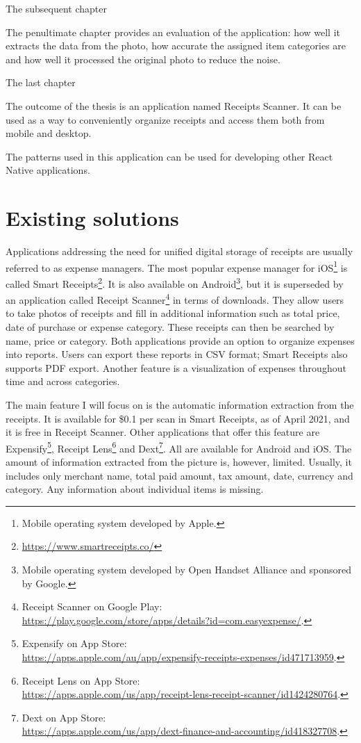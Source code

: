 \documentclass[
  printed, %
  table,   %
  oneside, %
  lof,     %
  lot,     %
]{fithesis3}
\begin{document}
The subsequent chapter

The penultimate chapter provides an evaluation of the application: how well it extracts the data from the photo, how accurate the assigned item categories are and how well it processed the original photo to reduce the noise.

The last chapter 

The outcome of the thesis is an application named Receipts Scanner. It can be used as a way to conveniently organize receipts and access them both from mobile and desktop. 

The patterns used in this application can be used for developing other React Native applications. 

\chapter{Existing solutions}

Applications addressing the need for unified digital storage of receipts are usually referred to as expense managers. The most popular expense manager for iOS\footnote{Mobile operating system developed by Apple.} is called Smart Receipts\footnote{\url{https://www.smartreceipts.co/}}. It is also available on Android\footnote{ Mobile operating system developed by Open Handset Alliance and sponsored by Google.}, but it is superseded by an application called Receipt Scanner\footnote{Receipt Scanner on Google Play:\\\url{https://play.google.com/store/apps/details?id=com.easyexpense/}.} in terms of downloads. They allow users to take photos of receipts and fill in additional information such as total price, date of purchase or expense category. These receipts can then be searched by name, price or category. Both applications provide an option to organize expenses into reports. Users can export these reports in CSV format; Smart Receipts also supports PDF export. Another feature is a visualization of expenses throughout time and across categories.

The main feature I will focus on is the automatic information extraction from the receipts. It is available for \$0.1 per scan in Smart Receipts, as of April 2021, and it is free in Receipt Scanner. Other applications that offer this feature are Expensify\footnote{Expensify on App Store:\\\url{https://apps.apple.com/au/app/expensify-receipts-expenses/id471713959}.}, Receipt Lens\footnote{Receipt Lens on App Store:\\\url{https://apps.apple.com/us/app/receipt-lens-receipt-scanner/id1424280764}.} and Dext\footnote{Dext on App Store:\\\url{https://apps.apple.com/us/app/dext-finance-and-accounting/id418327708}.}. All are available for Android and iOS. The amount of information extracted from the picture is, however, limited. Usually, it includes only merchant name, total paid amount, tax amount, date, currency and category. Any information about individual items is missing.
\end{document}
